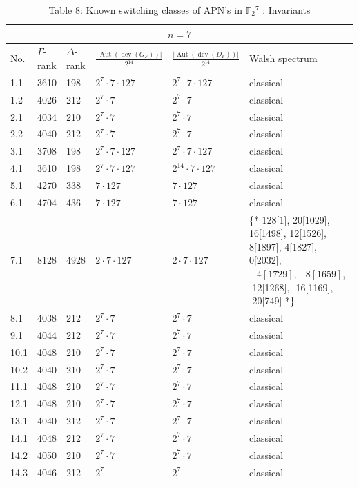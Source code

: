\documentclass[10pt]{article}
\begin{document}
\begin{table}[h]
\begin{center}
\begin{tabular}{|l|l|l|l|l|l|}
\hline
\multicolumn{6}{|c|}{$n=7$} \\
\hline
No. & $\Gamma$-rank & $\Delta$-rank & $\frac{\left|\operatorname{Aut}\left(\operatorname{dev}\left(G_{F}\right)\right)\right|}{2^{14}}$ & $\frac{\left|\operatorname{Aut}\left(\operatorname{dev}\left(D_{F}\right)\right)\right|}{2^{14}}$ & Walsh spectrum \\
\hline
1.1 & 3610 & 198 & $2^{7} \cdot 7 \cdot 127$ & $2^{7} \cdot 7 \cdot 127$ & classical \\
\hline
1.2 & 4026 & 212 & $2^{7} \cdot 7$ & $2^{7} \cdot 7$ & classical \\
\hline
2.1 & 4034 & 210 & $2^{7} \cdot 7$ & $2^{7} \cdot 7$ & classical \\
\hline
2.2 & 4040 & 212 & $2^{7} \cdot 7$ & $2^{7} \cdot 7$ & classical \\
\hline
3.1 & 3708 & 198 & $2^{7} \cdot 7 \cdot 127$ & $2^{7} \cdot 7 \cdot 127$ & classical \\
\hline
4.1 & 3610 & 198 & $2^{7} \cdot 7 \cdot 127$ & $2^{14} \cdot 7 \cdot 127$ & classical \\
\hline
5.1 & 4270 & 338 & $7 \cdot 127$ & $7 \cdot 127$ & classical \\
\hline
6.1 & 4704 & 436 & $7 \cdot 127$ & $7 \cdot 127$ & classical \\
\hline
7.1 & 8128 & 4928 & $2 \cdot 7 \cdot 127$ & $2 \cdot 7 \cdot 127$ & \{* 128[1], 20[1029], 16[1498], 12[1526], 8[1897], 4[1827], 0[2032], $-4[1729],-8[1659]$, -12[1268], -16[1169], -20[749] *\} \\
\hline
8.1 & 4038 & 212 & $2^{7} \cdot 7$ & $2^{7} \cdot 7$ & classical \\
\hline
9.1 & 4044 & 212 & $2^{7} \cdot 7$ & $2^{7} \cdot 7$ & classical \\
\hline
10.1 & 4048 & 210 & $2^{7} \cdot 7$ & $2^{7} \cdot 7$ & classical \\
\hline
10.2 & 4040 & 210 & $2^{7} \cdot 7$ & $2^{7} \cdot 7$ & classical \\
\hline
11.1 & 4048 & 210 & $2^{7} \cdot 7$ & $2^{7} \cdot 7$ & classical \\
\hline
12.1 & 4048 & 210 & $2^{7} \cdot 7$ & $2^{7} \cdot 7$ & classical \\
\hline
13.1 & 4040 & 212 & $2^{7} \cdot 7$ & $2^{7} \cdot 7$ & classical \\
\hline
14.1 & 4048 & 212 & $2^{7} \cdot 7$ & $2^{7} \cdot 7$ & classical \\
\hline
14.2 & 4050 & 210 & $2^{7} \cdot 7$ & $2^{7} \cdot 7$ & classical \\
\hline
14.3 & 4046 & 212 & $2^{7}$ & $2^{7}$ & classical \\
\hline
\end{tabular}
\captionsetup{labelformat=empty}
\caption{Table 8: Known switching classes of APN's in $\mathbb{F}_{2}{ }^{7}$ : Invariants}
\end{center}
\end{table}
\end{document}
